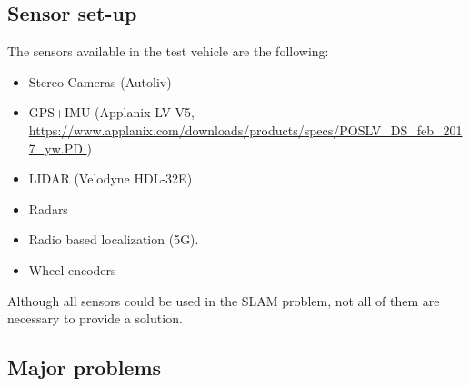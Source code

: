 \subsection{Sensor set-up}\label{sec:sensor-setup}
The sensors available in the test vehicle are the following:
\begin{itemize}
\item Stereo Cameras (Autoliv)
\item GPS+IMU (Applanix LV V5,
  \url{https://www.applanix.com/downloads/products/specs/POSLV_DS_feb_2017_yw.PD
  })
\item  \gls{LIDAR} (Velodyne HDL-32E)
\item  Radars
\item  Radio based localization (5G).
\item  Wheel encoders
\end{itemize}
Although all sensors could be used in the \gls{SLAM} problem, not all of them
are necessary to provide a solution.

\subsection{Major problems}

